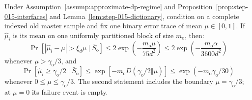 \begin{lemma}\label{lem:step-015-tails}
Under Assumption~\ref{assump:approximate-dp-regime} and
Proposition~\ref{prop:step-015-interfaces} and
Lemma~\ref{lem:step-015-dictionary}, condition on a complete indexed old
master sample and fix one binary error trace of mean
\(\mu\in[0,1]\). If \(\widehat\mu_i\) is its mean on one uniformly
partitioned block of size \(m_{\mathrm o}\), then:
\[
\Pr\!\left[
|\widehat\mu_i-\mu|>\xi_d\mu\mid\bar S_{\mathrm o}
\right]
\le2\exp\!\left(-\frac{m_{\mathrm o}\mu}{75d^2}\right)
\le2\exp\!\left(-\frac{m_{\mathrm o}\alpha}{3600d^2}\right)
\tag{8.1}
\]
whenever \(\mu>\gamma_{\mathrm o}/3\), and
\[
\Pr[\widehat\mu_i\ge\gamma_{\mathrm o}/2\mid\bar S_{\mathrm o}]
\le\exp[-m_{\mathrm o}
D(\gamma_{\mathrm o}/2\Vert\mu)]
\le\exp(-m_{\mathrm o}\gamma_{\mathrm o}/30)
\tag{8.2}
\]
whenever \(0\le\mu\le\gamma_{\mathrm o}/3\). The second statement includes
the boundary \(\mu=\gamma_{\mathrm o}/3\); at \(\mu=0\) its failure event
is empty.


\end{lemma}

